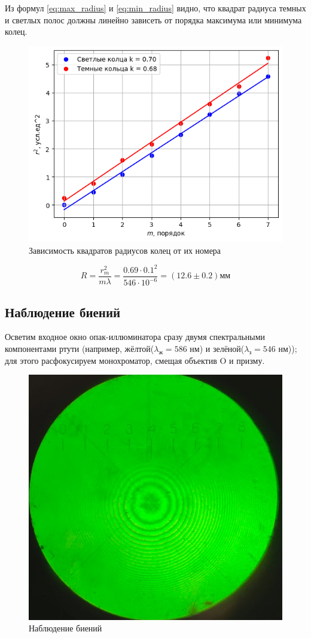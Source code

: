 Из формул \ref{eq:max_radius} и \ref{eq:min_radius} видно, что квадрат радиуса темных и светлых полос должны линейно зависеть от 
порядка максимума или минимума колец.
\begin{figure}[h!]
    \centering
    \includegraphics[width=12cm]{images/plot1.png}
    \caption{Зависимость квадратов радиусов колец от их номера}
\end{figure}

$$
R = \frac{r_m^2}{m\lambda} = \frac{0.69 \cdot 0.1^2}{546 \cdot 10^{-6}} = (12.6 \pm 0.2)  \text{мм}
$$


\subsection*{Наблюдение биений}

Осветим входное окно опак-иллюминатора сразу двумя спектральными компонентами ртути (например, жёлтой($\lambda_{\text{ж}} = 586$ нм) и зелёной($\lambda_{\text{з}} = 546$ нм)); для этого расфокусируем монохроматор, смещая объектив O и призму.
\begin{figure}[h!]
    \centering
    \includegraphics[width=12cm]{images/picture.jpg}
    \caption{Наблюдение биений}
\end{figure}

